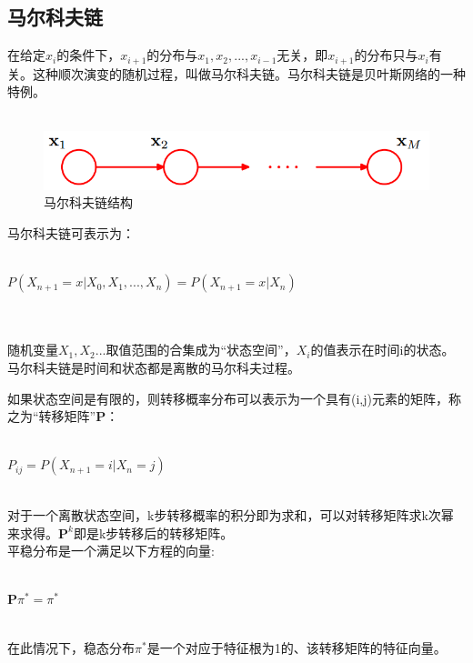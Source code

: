 \subsection*{马尔科夫链}
\begin{frame}
	在给定$x_i$的条件下，$x_{i+1}$的分布与$x_1,x_2,...,x_{i-1}$无关，即$x_{i+1}$的分布只与$x_i$有关。这种顺次演变的随机过程，叫做马尔科夫链。马尔科夫链是贝叶斯网络的一种特例。
	~\\
	~\\
	\begin{figure}
		\centering
		\includegraphics[scale=0.4]{pic/markov.png}
		\caption{马尔科夫链结构}
		\label{0-006}
	\end{figure}
\end{frame}

\begin{frame}
	马尔科夫链可表示为：
	~\\
	~\\
	\centerline{{\large $P(X_{n+1}=x|X_0,X_1,...,X_n)=P(X_{n+1}=x|X_n)$}}
	~\\
	~\\
	随机变量$X_1,X_2...$取值范围的合集成为“状态空间”，$X_i$的值表示在时间i的状态。马尔科夫链是时间和状态都是离散的马尔科夫过程。
\end{frame}

\begin{frame}
	如果状态空间是有限的，则转移概率分布可以表示为一个具有(i,j)元素的矩阵，称之为“转移矩阵”$\mathbf{P}$：
	~\\
	~\\
	\centerline{$P_{ij}=P(X_{n+1}=i|X_n=j)$}
	~\\
	对于一个离散状态空间，k步转移概率的积分即为求和，可以对转移矩阵求k次幂来求得。$\mathbf{P}^k$即是k步转移后的转移矩阵。\\平稳分布是一个满足以下方程的向量:
	~\\
	~\\
	\centerline{$\mathbf{P}\pi^*=\pi^*$}
	~\\
	在此情况下，稳态分布$\pi^*$是一个对应于特征根为1的、该转移矩阵的特征向量。
\end{frame}

